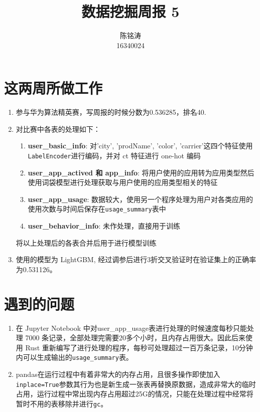 \documentclass[12pt]{article}
\begin{document}
\author{陈铭涛\\16340024}
\title{数据挖掘周报 5}
\maketitle

\medskip


\section{这两周所做工作}
\begin{enumerate}
    \item 参与华为算法精英赛，写周报的时候分数为0.536285，排名40.
    \item 对比赛中各表的处理如下：
    \begin{enumerate}
        \item {\bf user\_basic\_info}: 对'city', 'prodName', 'color', 'carrier'这四个特征使用\lstinline{LabelEncoder}进行编码，并对 ct 特征进行 one-hot 编码
        \item {\bf user\_app\_actived 和 app\_info}: 将用户使用的应用转为应用类型然后使用词袋模型进行处理获取与用户使用的应用类型相关的特征
        \item {\bf user\_app\_usage}: 数据较大，使用另一个程序处理为用户对各类应用的使用次数与时间后保存在\lstinline{usage_summary}表中
        \item {\bf user\_behavior\_info}: 未作处理，直接用于训练
    \end{enumerate}
    将以上处理后的各表合并后用于进行模型训练

    \item 使用的模型为 LightGBM, 经过调参后进行3折交叉验证时在验证集上的正确率为0.531126。
\end{enumerate}

\section{遇到的问题}
\begin{enumerate}
    \item 在 Jupyter Notebook 中对user\_app\_usage表进行处理的时候速度每秒只能处理 7000 条记录，全部处理完需要20多个小时，且内存占用很大。因此后来使用 Rust 重新编写了进行处理的程序，每秒可处理超过一百万条记录，10分钟内可以生成输出的\lstinline{usage_summary}表。
    \item pandas在运行过程中有着非常大的内存占用，且很多操作即使加入\lstinline{inplace=True}参数其行为也是新生成一张表再替换原数据，造成非常大的临时占用，运行过程中常出现内存占用超过25G的情况，只能在处理过程中经常将暂时不用的表移除并进行\lstinline{gc}。
\end{enumerate}
\end{document}
